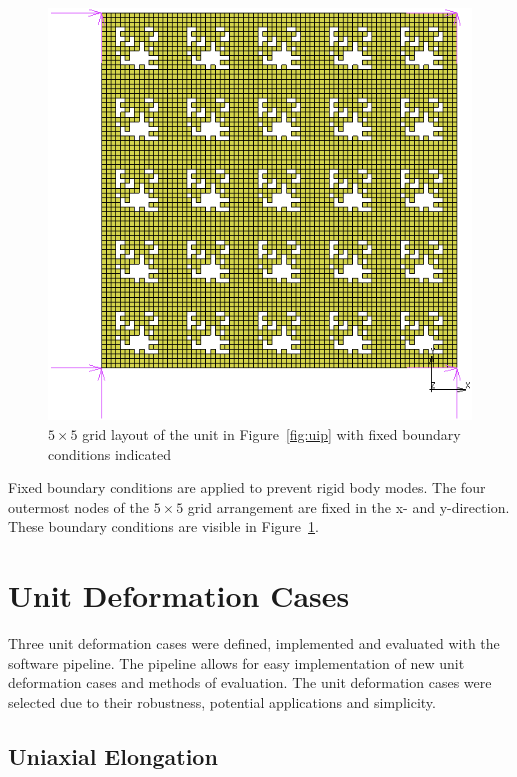 \begin{figure}[H]
	\centering
	\includegraphics[width=\textwidth]{5x5Layout.png}
	\caption[$5\times 5$ grid layout with fixed boundary conditions indicated]{$5\times 5$ grid layout of the unit in Figure~\ref{fig:uip} with fixed boundary conditions indicated}
	\label{fig:5x5grid}
\end{figure}

Fixed boundary conditions are applied to prevent rigid body modes. The four outermost nodes of the $5\times 5$ grid arrangement are fixed in the x- and y-direction. These boundary conditions are visible in Figure~\ref{fig:5x5grid}.

\section{Unit Deformation Cases}
\label{sec:UC}

Three unit deformation cases were defined, implemented and evaluated with the software pipeline. The pipeline allows for easy implementation of new unit deformation cases and methods of evaluation. The unit deformation cases were selected due to their robustness, potential applications and simplicity.

\subsection{Uniaxial Elongation}

